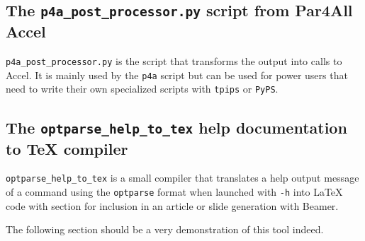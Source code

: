 \documentclass[a4paper]{article}
\begin{document}



\subsection{The \protect\texttt{p4a\_post\_processor.py} script from
  Par4All Accel}
\label{sec:p4a_p-script-from}

\verb|p4a_post_processor.py| is the script that transforms the \Apips
output into calls to \Apfa Accel. It is mainly used by the \texttt{p4a}
script but can be used for power users that need to write their own
specialized \Apips scripts with \texttt{tpips} or \texttt{PyPS}.




\subsection{The \protect\texttt{optparse\_help\_to\_tex} help
  documentation to \TeX{} compiler}
\label{sec:help-docum-tex}

\verb|optparse_help_to_tex| is a small compiler that translates a help
output message of a command using the \texttt{optparse} format when
launched with \texttt{-h} into La\TeX{} code with section for inclusion in
an article or slide generation with Beamer.

The following section should be a very demonstration of this tool
indeed. \smiley



\end{document}
